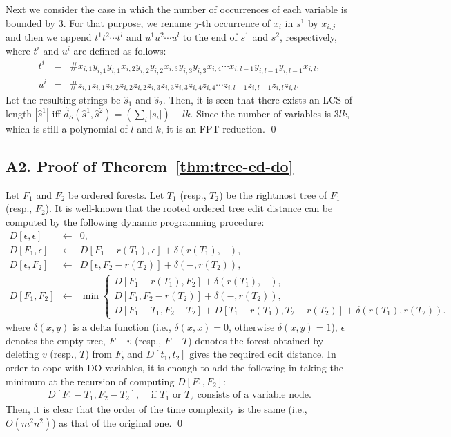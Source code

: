 \documentclass[a4paper]{llncs}
\begin{document}
Next we consider the case in which the number of occurrences of each
variable is bounded by 3.
For that purpose, we rename $j$-th occurrence of $x_i$ in $s^1$
by $x_{i,j}$ and then we append $t^1 t^2 \cdots t^l$ and
$u^1 u^2 \cdots u^l$ to the end of $s^1$ and $s^2$, respectively,
where $t^i$ and $u^i$ are defined as follows:
\begin{eqnarray*}
t^i & = & \# x_{i,1} y_{i,1} y_{i,1} x_{i,2} y_{i,2} y_{i,2} x_{i,3} y_{i,3} y_{i,3} x_{i,4} \cdots x_{i,l-1} y_{i,l-1} y_{i,l-1} x_{i,l}, \\
u^i & = & \# z_{i,1} z_{i,1} z_{i,2} z_{i,2} z_{i,2} z_{i,3} z_{i,3} z_{i,3} z_{i,4} z_{i,4} \cdots z_{i,l-1} z_{i,l-1} z_{i,l} z_{i,l}.
\end{eqnarray*}
Let the resulting strings be $\hat{s}_1$ and $\hat{s}_2$.
Then, it is seen that
there exists an LCS of length $|\hat{s}^1|$ iff
$\hat{d}_S(\hat{s}^1,\hat{s}^2) = (\sum_i |s_i|)-lk$.
Since the number of variables is $3lk$, which is still a polynomial of
$l$ and $k$, it is an FPT reduction.
\qed

\subsection*{A2. Proof of Theorem~\ref{thm:tree-ed-do}}

Let $F_1$ and $F_2$ be ordered forests.
Let $T_1$ (resp., $T_2$) be the rightmost tree
of $F_1$ (resp., $F_2$).
It is well-known \cite{bille05} that
the rooted ordered tree edit distance can be
computed by the following dynamic programming procedure:
\begin{eqnarray*}
D[\epsilon,\epsilon] & \leftarrow & 0,\\
D[F_1,\epsilon] & \leftarrow & D[F_1-r(T_1),\epsilon] + \delta(r(T_1),-),\\
D[\epsilon,F_2] & \leftarrow & D[\epsilon,F_2-r(T_2)] + \delta(-,r(T_2)),\\
D[F_1,F_2] & \leftarrow & \min \left\{
\begin{array}{l}
D[F_1-r(T_1),F_2]+\delta(r(T_1),-),\\
D[F_1,F_2-r(T_2)]+\delta(-,r(T_2)),\\
D[F_1-T_1,F_2-T_2]+D[T_1-r(T_1),T_2-r(T_2)]+\delta(r(T_1),r(T_2)).
\end{array}
\right.
\end{eqnarray*}
where $\delta(x,y)$ is a delta function
(i.e., $\delta(x,x)=0$, otherwise $\delta(x,y)=1$),
$\epsilon$ denotes the empty tree,
$F-v$ (resp., $F-T$) denotes the forest obtained by deleting $v$ (resp., $T$)
from $F$, and $D[t_1,t_2]$ gives the required edit distance.
In order to cope with DO-variables,
it is enough to add the following in taking the minimum at the recursion
of computing $D[F_1,F_2]$:
\begin{eqnarray*}
D[F_1-T_1,F_2-T_2],~~~~~ \mbox{if $T_1$ or $T_2$ consists of a variable node}.
\end{eqnarray*}
Then, it is clear that
the order of the time complexity is the same (i.e., $O(m^2 n^2)$)
as that of the original one.
\qed
\end{document}
